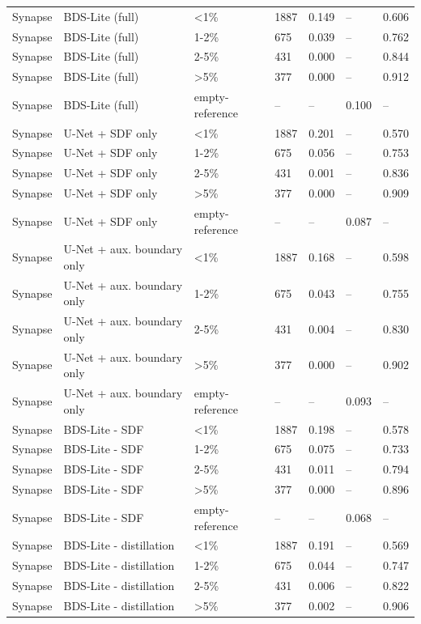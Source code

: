 \begin{longtable}{lllllll}
Synapse & BDS-Lite (full) & <1\% & 1887 & 0.149 & -- & 0.606 \\
Synapse & BDS-Lite (full) & 1-2\% & 675 & 0.039 & -- & 0.762 \\
Synapse & BDS-Lite (full) & 2-5\% & 431 & 0.000 & -- & 0.844 \\
Synapse & BDS-Lite (full) & >5\% & 377 & 0.000 & -- & 0.912 \\
Synapse & BDS-Lite (full) & empty-reference & -- & -- & 0.100 & -- \\
Synapse & U-Net + SDF only & <1\% & 1887 & 0.201 & -- & 0.570 \\
Synapse & U-Net + SDF only & 1-2\% & 675 & 0.056 & -- & 0.753 \\
Synapse & U-Net + SDF only & 2-5\% & 431 & 0.001 & -- & 0.836 \\
Synapse & U-Net + SDF only & >5\% & 377 & 0.000 & -- & 0.909 \\
Synapse & U-Net + SDF only & empty-reference & -- & -- & 0.087 & -- \\
Synapse & U-Net + aux. boundary only & <1\% & 1887 & 0.168 & -- & 0.598 \\
Synapse & U-Net + aux. boundary only & 1-2\% & 675 & 0.043 & -- & 0.755 \\
Synapse & U-Net + aux. boundary only & 2-5\% & 431 & 0.004 & -- & 0.830 \\
Synapse & U-Net + aux. boundary only & >5\% & 377 & 0.000 & -- & 0.902 \\
Synapse & U-Net + aux. boundary only & empty-reference & -- & -- & 0.093 & -- \\
Synapse & BDS-Lite - SDF & <1\% & 1887 & 0.198 & -- & 0.578 \\
Synapse & BDS-Lite - SDF & 1-2\% & 675 & 0.075 & -- & 0.733 \\
Synapse & BDS-Lite - SDF & 2-5\% & 431 & 0.011 & -- & 0.794 \\
Synapse & BDS-Lite - SDF & >5\% & 377 & 0.000 & -- & 0.896 \\
Synapse & BDS-Lite - SDF & empty-reference & -- & -- & 0.068 & -- \\
Synapse & BDS-Lite - distillation & <1\% & 1887 & 0.191 & -- & 0.569 \\
Synapse & BDS-Lite - distillation & 1-2\% & 675 & 0.044 & -- & 0.747 \\
Synapse & BDS-Lite - distillation & 2-5\% & 431 & 0.006 & -- & 0.822 \\
Synapse & BDS-Lite - distillation & >5\% & 377 & 0.002 & -- & 0.906 \\

\end{longtable}
